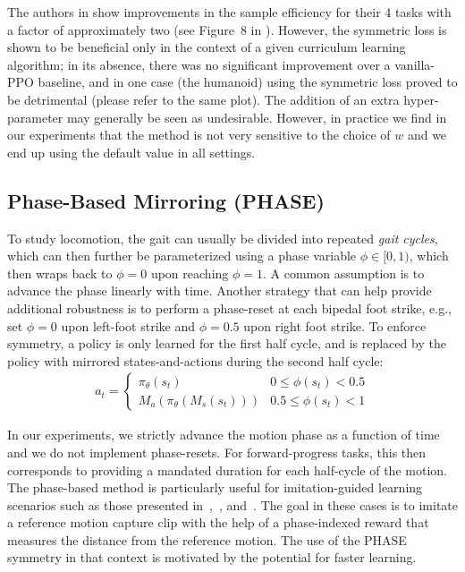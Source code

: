 The authors in \cite{Yu-SIGGRAPH-2018} show improvements in the sample efficiency for their 4 tasks with a 
factor of approximately two (see Figure~8 in \cite{Yu-SIGGRAPH-2018}).
However, the symmetric loss is shown to be beneficial only in the context of a given curriculum learning algorithm;
in its absence, there was no significant improvement over a vanilla-PPO baseline,
and in one case (the humanoid) using the symmetric loss proved to be detrimental (please refer to the same plot).
The addition of an extra hyper-parameter may generally be seen as undesirable. 
However, in practice we find in our experiments that the method is not very sensitive 
to the choice of $w$ and we end up using the default value in all settings.

\subsection{Phase-Based Mirroring (PHASE)}

To study locomotion, the gait can usually be divided into repeated \textit{gait cycles},
which can then further be parameterized using a phase variable $\phi \in [0,1)$,
which then wraps back to $\phi=0$ upon reaching $\phi=1$.
A common assumption is to advance the phase linearly with time.  
Another strategy that can help provide additional robustness is to perform a
phase-reset at each bipedal foot strike, e.g., set $\phi=0$ upon left-foot strike
and $\phi=0.5$ upon right foot strike. 
To enforce symmetry, a policy is only learned for the first half cycle, 
and is replaced by the policy with mirrored states-and-actions during the second half cycle:
\begin{align}
    a_t = \begin{cases}
    \pi_\theta(s_t) & 0 \leq \phi(s_t) < 0.5\\
    M_a(\pi_\theta(M_s(s_t))) & 0.5 \leq \phi(s_t) < 1
    \end{cases}
    \label{eq:phase-based-symmetry}
\end{align}

In our experiments, we strictly advance the motion phase as a function
of time and we do not implement phase-resets.  For forward-progress tasks,
this then corresponds to providing a mandated duration for each half-cycle of the motion.
The phase-based method is particularly useful for imitation-guided learning scenarios
such as those presented in~\cite{2017-TOG-deepLoco},~\cite{2018-TOG-deepMimic},
and~\cite{cassie-sim-to-real}.
The goal in these cases is to imitate a reference motion capture clip with 
the help of a phase-indexed reward that measures the distance from the reference motion.
The use of the PHASE symmetry in that context is motivated by the potential
for faster learning.

